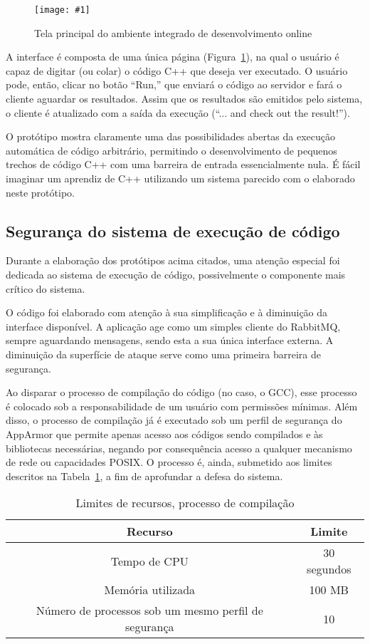 \documentclass[ruledheader, 12pt]{abnt}
\newcommand{\figcustom}[4]{\par
	\begin{figure}[#3]
		\centering
		\texttt{[image: \#1]}
		\caption{\label{fig:#1}#2}
	\end{figure}
\par}
\newcommand{\figref}[1]{(Figura~\ref{fig:#1})}
\newcommand{\tblref}[1]{Tabela~\ref{tbl:#1}}
\begin{document}
\figcustom{ide}{Tela principal do ambiente integrado de desenvolvimento online}{p}{.9}

A interface é composta de uma única página \figref{ide}, na qual o usuário é capaz de digitar (ou colar) o código C++ que deseja ver executado. O usuário pode, então, clicar no botão ``Run,'' que enviará o código ao servidor e fará o cliente aguardar os resultados. Assim que os resultados são emitidos pelo sistema, o cliente é atualizado com a saída da execução (``... and check out the result!'').

\clearpage

O protótipo mostra claramente uma das possibilidades abertas da execução automática de código arbitrário, permitindo o desenvolvimento de pequenos trechos de código C++ com uma barreira de entrada essencialmente nula. É fácil imaginar um aprendiz de C++ utilizando um sistema parecido com o elaborado neste protótipo.

\subsection{Segurança do sistema de execução de código}

Durante a elaboração dos protótipos acima citados, uma atenção especial foi dedicada ao sistema de execução de código, possivelmente o componente mais crítico do sistema. 

O código foi elaborado com atenção à sua simplificação e à diminuição da interface disponível. A aplicação age como um simples cliente do RabbitMQ, sempre aguardando mensagens, sendo esta a sua única interface externa. A diminuição da superfície de ataque serve como uma primeira barreira de segurança.


Ao disparar o processo de compilação do código (no caso, o GCC), esse processo é colocado sob a responsabilidade de um usuário com permissões mínimas. Além disso, o processo de compilação já é executado sob um perfil de segurança do AppArmor que permite apenas acesso aos códigos sendo compilados e às bibliotecas necessárias, negando por consequência acesso a qualquer mecanismo de rede ou capacidades POSIX. O processo é, ainda, submetido aos limites descritos na \tblref{compilation-limits}, a fim de aprofundar a defesa do sistema.

\begin{table}[h]
	\centering
	\caption{\label{tbl:compilation-limits}Limites de recursos, processo de compilação}
	\begin{tabular}{c c}\hline
		\hline
		Recurso & Limite \\\hline
		\hline
		Tempo de CPU & 30 segundos \\\hline
		Memória utilizada & 100 MB \\\hline
		Número de processos sob um mesmo perfil de segurança & 10 \\\hline
		\hline
	\end{tabular}
\end{table}
\end{document}
